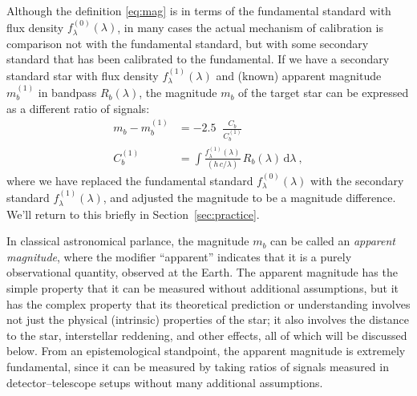 \documentclass[10pt]{article}
\newcommand{\sectionname}{Section}
\newcommand{\secref}[1]{\sectionname~\ref{#1}}
\newcommand{\dd}{\mathrm{d}}
\DeclareMathOperator{\logten}{log_{10}}
\begin{document}
Although the definition \eqref{eq:mag} is in terms of the fundamental standard with flux density $f^{(0)}_\lambda(\lambda)$, in many cases the actual mechanism of calibration is comparison not with the fundamental standard, but with some secondary standard that has been calibrated to the fundamental.
If we have a secondary standard star with flux density $f^{(1)}_\lambda(\lambda)$ and (known) apparent magnitude $m_b^{(1)}$ in bandpass $R_b(\lambda)$, the magnitude $m_b$ of the target star can be expressed as a different ratio of signals:
\begin{align}
    m_b - m_b^{(1)} &= -2.5\logten\frac{C_b}{C^{(1)}_b}\label{eq:secondary}\\
    C^{(1)}_b &= \int \frac{f^{(1)}_\lambda(\lambda)}{(h\,c/\lambda)}\,R_b(\lambda)\,\dd\lambda ~,
\end{align}
where we have replaced the fundamental standard $f^{(0)}_\lambda(\lambda)$ with the secondary standard $f^{(1)}_\lambda(\lambda)$, and adjusted the magnitude to be a magnitude difference.
We'll return to this briefly in \secref{sec:practice}.

In classical astronomical parlance, the magnitude $m_b$ can be called an \emph{apparent magnitude}, where the modifier ``apparent'' indicates that it is a purely observational quantity, observed at the Earth.
The apparent magnitude has the simple property that it can be measured without additional assumptions, but it has the complex property that its theoretical prediction or understanding involves not just the physical (intrinsic) properties of the star; it also involves the distance to the star, interstellar reddening, and other effects, all of which will be discussed below.
From an epistemological standpoint, the apparent magnitude is extremely fundamental, since it can be measured by taking ratios of signals measured in detector--telescope setups without many additional assumptions.
\end{document}
